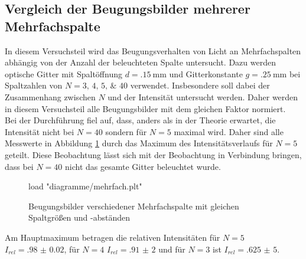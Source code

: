 \subsection{Vergleich der Beugungsbilder mehrerer Mehrfachspalte}
In diesem Versuchsteil wird das Beugungsverhalten von Licht an Mehrfachspalten abhängig von der Anzahl der beleuchteten Spalte untersucht. Dazu werden optische Gitter mit Spaltöffnung $ d = \SI{,15}{\milli\meter} $ und Gitterkonstante $ g = \SI{.25}{\milli\meter} $ bei Spaltzahlen von $ N = \numlist{3;4;5;40} $ verwendet. Insbesondere soll dabei der Zusammenhang zwischen $ N $ und der Intensität untersucht werden. Daher werden in diesem Versuchsteil alle Beugungsbilder mit dem gleichen Faktor normiert. \\
Bei der Durchführung fiel auf, dass, anders als in der Theorie erwartet, die Intensität nicht bei $ N = 40 $ sondern für $ N = 5 $ maximal wird. Daher sind alle Messwerte in Abbildung \ref{fig:beug-mehrfach} durch das Maximum des Intensitätsverlaufs für $ N = 5 $ geteilt. Diese Beobachtung lässt sich mit der Beobachtung in Verbindung bringen, dass bei $ N = 40 $ nicht das gesamte Gitter beleuchtet wurde.

\begin{figure}[H]
	\centering
	\begin{gnuplot}[terminal=pdf, terminaloptions=color]
		load "diagramme/mehrfach.plt"
	\end{gnuplot}
	\caption{Beugungsbilder verschiedener Mehrfachspalte mit gleichen Spaltgrößen und -abständen}
	\label{fig:beug-mehrfach}
\end{figure}
Am Hauptmaximum betragen die relativen Intensitäten für $ N = 5 $ $ I_{rel} = \num{.98(2)} $, für $ N = 4 $ $ I_{rel} = \num{,91(2)} $ und für $ N = 3 $ ist $ I_{rel} = \num{,625(5)} $.

